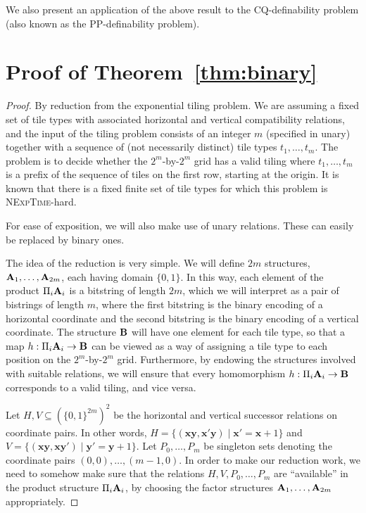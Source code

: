 \documentclass{article}
\newcommand{\aest}{{\bf A}}
\newcommand{\best}{{\bf B}}
\newcommand{\nexptime}{\textsc{NExpTime}\xspace}
\begin{document}
We also present an application of the above result to the
CQ-definability problem (also known as the PP-definability problem).


\section{Proof of Theorem~\ref{thm:binary}}

\begin{proof}
    By reduction from the exponential tiling problem. We are assuming a fixed set of tile types with associated horizontal and vertical compatibility relations, and the input of the 
    tiling problem consists of an integer $m$ (specified in unary) together with a 
  sequence of (not necessarily distinct) tile types $t_1, \ldots, t_m$. The problem is to
  decide whether the $2^m$-by-$2^m$ grid has a valid tiling where $t_1, \ldots, t_m$
   is a prefix of the sequence of tiles on the first row, starting at
   the origin.
  It is known that there is a fixed finite set of tile types for which
  this problem is \nexptime-hard.



  For ease of exposition, we will also make use of unary
  relations. These can easily be replaced by binary ones.

   The idea of the reduction is very simple.     We will define $2m$ structures, $\aest_1, \ldots, \aest_{2m}$,
   each having domain $\{0,1\}$. In this way, each element of the product $\Pi_i \aest_i$ is a bitstring of length $2m$, which we will interpret as a pair of bistrings of length $m$, where the first bitstring is the binary encoding of a horizontal coordinate and the second bitstring is the binary encoding of a vertical coordinate. The structure $\best$ will have one element for each tile type, so that a map $h:\Pi_i \aest_i\to \best$ can be viewed as a way of assigning a tile type to each position on the $2^m$-by-$2^m$ grid. Furthermore, by endowing the structures involved with suitable relations, we will ensure that every homomorphism $h:\Pi_i \aest_i\to \best$ corresponds to a valid tiling, and vice versa.

    Let $H, V\subseteq (\{0,1\}^{2m})^2$ be the horizontal and vertical successor relations on coordinate
    pairs.
    In other words, $H = \{(\textbf{x}\textbf{y}, \textbf{x}'\textbf{y})\mid
    \textbf{x}'=\textbf{x}+1\}$ and $V = \{(\textbf{x}\textbf{y}, \textbf{x}\textbf{y}')\mid
    \textbf{y}'=\textbf{y}+1\}$.
 Let $P_0, \ldots, P_m$ be singleton sets denoting the coordinate pairs
    $(0,0), \ldots, (m-1, 0)$. In order to make our reduction work, we need to somehow make
sure that the relations $H, V, P_0, \ldots, P_m$ are ``available'' in the product structure $\Pi_i \aest_i$, by choosing the factor structures $\aest_1, \ldots, \aest_{2m}$ appropriately.


\end{proof}
\end{document}
